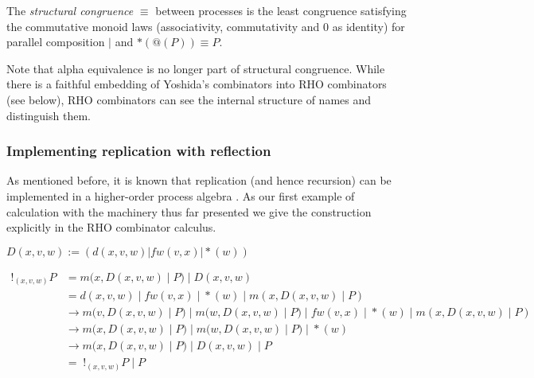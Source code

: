 \documentclass{llncs}
\newcommand{\pzero}{\mathbin{0}}
\newcommand{\red}{\rightarrow}
\begin{document}
\begin{definition}
  The {\em structural congruence} $\equiv$
  between processes \cite{SangiorgiWalker} is the least congruence
  satisfying the commutative monoid laws
  (associativity, commutativity and $\pzero$ as identity) for parallel
  composition $|$ and $*(@(P)) \equiv P$.
\end{definition}

Note that alpha equivalence is no longer part of structural congruence.  While there is a faithful embedding of Yoshida's combinators into RHO combinators (see below), RHO combinators can see the internal structure of names and distinguish them.

\subsubsection{Implementing replication with reflection}

% 
% 
% 
% 
% 
As mentioned before, it is known that replication (and hence
recursion) can be implemented in a higher-order process algebra
\cite{SangiorgiWalker}. As our first example of calculation with the
machinery thus far presented we give the construction explicitly in
the RHO combinator calculus.

\begin{definition}[Replication]
  \label{replication}
  $D(x,v,w) := (d(x,v,w) | fw(v,x) | {*}(w))$
\end{definition}
\[\begin{array}{rl}
  !_{(x,v,w)} P &= m(x,D(x,v,w) \; |\; P) \; |\; D(x,v,w) \\
        &= d(x,v,w) \; |\; fw(v,x) \; |\; {*}(w) \; |\; m(x,D(x,v,w) \; |\; P) \\
        &\red m(v,D(x,v,w) \; |\; P) \; |\; m(w,D(x,v,w) \; |\; P) \; |\; fw(v,x) \; |\; {*}(w) \; |\; m(x,D(x,v,w) \; |\; P) \\
        &\red m(x,D(x,v,w) \; |\; P) \; |\; m(w,D(x,v,w) \; |\; P) \; |\; {*}(w) \\
        &\red m(x,D(x,v,w) \; |\; P) \; |\; D(x,v,w) \; |\; P \\
        & = \; !_{(x,v,w)} P \; |\; P
\end{array}\]
\end{document}
